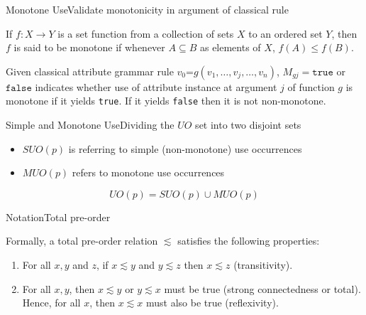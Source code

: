 \begin{frame}{Monotone Use}{Validate monotonicity in argument of classical rule}

\begin{definition}
If $f:X \rightarrow Y$ is a set function from a collection of sets $X$ to an ordered set $Y$, then $f$ is said to be monotone if whenever $A \subseteq B$ as elements of $X$, $f(A) \leq f(B)$. 
\end{definition}

\begin{definition}
Given classical attribute grammar rule $v_0 \texttt{=} g(v_1, \dots, v_j, \dots, v_n)$, $M_{g j} = \texttt{true}$ or $\texttt{false}$ indicates whether use of attribute instance at argument $j$ of function $g$ is monotone if it yields \texttt{true}. If it yields \texttt{false} then it is not non-monotone.
\end{definition}    
    
\end{frame}

\begin{frame}{Simple and Monotone Use}{Dividing the $\mathit{UO}$ set into two disjoint sets}

\begin{itemize}
    \item $\mathit{SUO}(p)$ is referring to \alert{simple} (non-monotone) use occurrences  
    \item $\mathit{MUO}(p)$ refers to \alert{monotone} use occurrences
\end{itemize}

\newlinevspace

    \[ \mathit{UO}(p) = \mathit{SUO}(p) \cup \mathit{MUO}(p) \]

\end{frame}

\begin{frame}{Notation}{Total pre-order}

Formally, a total pre-order relation $\lesssim$ satisfies the following properties:

\begin{enumerate}
    \item For all $x,y$ and $z$, if $x\lesssim y$ and $y\lesssim z$ then $x\lesssim z$ (\alert{transitivity}).
    \item For all $x, y$, then $x\lesssim y$ or $y\lesssim x$ must be true (strong connectedness or \alert{total}). Hence, for all $x$, then $x\lesssim x$ must also be true (\alert{reflexivity}).
\end{enumerate}    

\end{frame}

